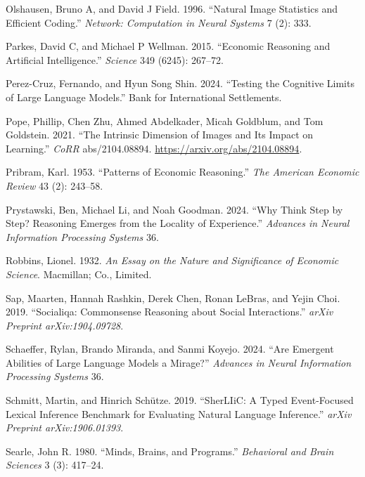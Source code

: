\documentclass[
]{article}
\newlength{\cslhangindent}
\newenvironment{CSLReferences}[2] %
 {\begin{list}{}{%
  \setlength{\itemindent}{0pt}
  \setlength{\leftmargin}{0pt}
  \setlength{\parsep}{0pt}
  \ifodd #1
   \setlength{\leftmargin}{\cslhangindent}
   \setlength{\itemindent}{-1\cslhangindent}
  \fi
  \setlength{\itemsep}{#2\baselineskip}}}
 {\end{list}}
\begin{document}
\begin{CSLReferences}{1}{0}
Olshausen, Bruno A, and David J Field. 1996. {``Natural Image Statistics
and Efficient Coding.''} \emph{Network: Computation in Neural Systems} 7
(2): 333.

Parkes, David C, and Michael P Wellman. 2015. {``Economic Reasoning and
Artificial Intelligence.''} \emph{Science} 349 (6245): 267--72.

Perez-Cruz, Fernando, and Hyun Song Shin. 2024. {``Testing the Cognitive
Limits of Large Language Models.''} Bank for International Settlements.

Pope, Phillip, Chen Zhu, Ahmed Abdelkader, Micah Goldblum, and Tom
Goldstein. 2021. {``The Intrinsic Dimension of Images and Its Impact on
Learning.''} \emph{CoRR} abs/2104.08894.
\url{https://arxiv.org/abs/2104.08894}.

Pribram, Karl. 1953. {``Patterns of Economic Reasoning.''} \emph{The
American Economic Review} 43 (2): 243--58.

Prystawski, Ben, Michael Li, and Noah Goodman. 2024. {``Why Think Step
by Step? Reasoning Emerges from the Locality of Experience.''}
\emph{Advances in Neural Information Processing Systems} 36.

Robbins, Lionel. 1932. \emph{An Essay on the Nature and Significance of
Economic Science}. Macmillan; Co., Limited.

Sap, Maarten, Hannah Rashkin, Derek Chen, Ronan LeBras, and Yejin Choi.
2019. {``Socialiqa: Commonsense Reasoning about Social Interactions.''}
\emph{arXiv Preprint arXiv:1904.09728}.

Schaeffer, Rylan, Brando Miranda, and Sanmi Koyejo. 2024. {``Are
Emergent Abilities of Large Language Models a Mirage?''} \emph{Advances
in Neural Information Processing Systems} 36.

Schmitt, Martin, and Hinrich Schütze. 2019. {``SherLIiC: A Typed
Event-Focused Lexical Inference Benchmark for Evaluating Natural
Language Inference.''} \emph{arXiv Preprint arXiv:1906.01393}.

Searle, John R. 1980. {``Minds, Brains, and Programs.''}
\emph{Behavioral and Brain Sciences} 3 (3): 417--24.


\end{CSLReferences}
\end{document}
